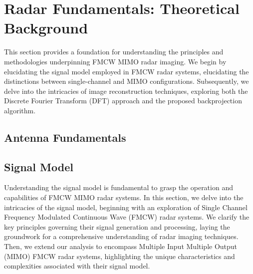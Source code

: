 \chapter{Radar Fundamentals: Theoretical Background}
This section provides a foundation for understanding the principles and methodologies underpinning FMCW MIMO radar imaging.
We begin by elucidating the signal model employed in FMCW radar systems, elucidating the distinctions between single-channel and MIMO configurations.
Subsequently, we delve into the intricacies of image reconstruction techniques,
exploring both the Discrete Fourier Transform (DFT) approach and the proposed backprojection algorithm.
\section{Antenna Fundamentals}
\section{Signal Model}
Understanding the signal model is fundamental to grasp the operation and capabilities of FMCW MIMO radar systems.
In this section, we delve into the intricacies of the signal model,
beginning with an exploration of Single Channel Frequency Modulated Continuous Wave (FMCW) radar systems.
We clarify the key principles governing their signal generation and processing,
laying the groundwork for a comprehensive understanding of radar imaging techniques.
Then, we extend our analysis to encompass Multiple Input Multiple Output (MIMO) FMCW radar systems,
highlighting the unique characteristics and complexities associated with their signal model.

